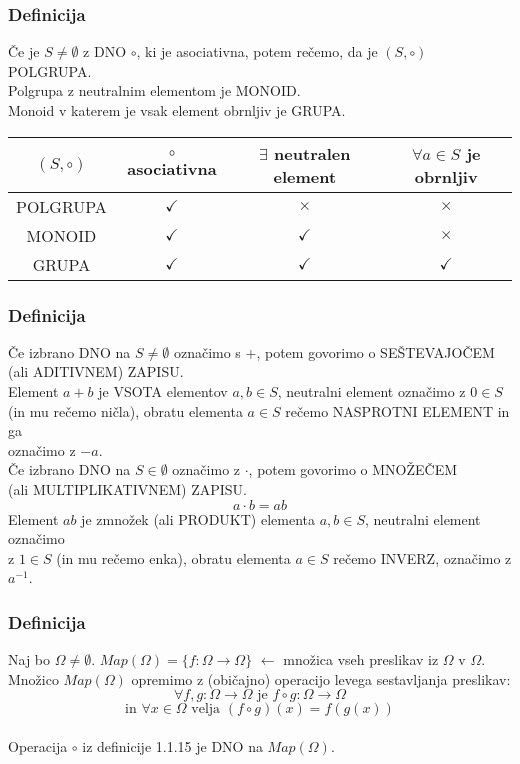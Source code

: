\subsubsection{Definicija}
Če je $S \ne \emptyset$ z DNO $\circ$, ki je asociativna, potem rečemo, da je $(S, \circ)$ POLGRUPA.\\
Polgrupa z neutralnim elementom je MONOID. \\
Monoid v katerem je vsak element obrnljiv je GRUPA.
\begin{center}
    \begin{tabular}{|c|c|c|c|}
        \hline
        $(S, \circ)$ & $\circ$ asociativna & $\exists$ neutralen element & $\forall a \in S$ je obrnljiv \\
        \hline
        POLGRUPA & $\checkmark$ & $\times$ & $\times$ \\
        \hline
        MONOID & $\checkmark$ & $\checkmark$ & $\times$ \\
        \hline
        GRUPA & $\checkmark$ & $\checkmark$ & $\checkmark$ \\
        \hline
    \end{tabular}
\end{center}

\subsubsection{Definicija}
Če izbrano DNO na $S \ne \emptyset$ označimo s +, potem govorimo o SEŠTEVAJOČEM \\
(ali ADITIVNEM) ZAPISU. \\[1em]
Element $a + b$ je VSOTA elementov $a, b \in S$, neutralni element označimo z $0 \in S$ \\
(in mu rečemo ničla), obratu elementa $a \in S$ rečemo NASPROTNI ELEMENT in ga \\
označimo z $-a$. \\[1em]
Če izbrano DNO na $S \in \emptyset$ označimo z $\cdot$, potem govorimo o MNOŽEČEM \\
(ali MULTIPLIKATIVNEM) ZAPISU.
$$a \cdot b = ab$$
Element $ab$ je zmnožek (ali PRODUKT) elementa $a, b \in S$, neutralni element označimo \\
z $1 \in S$ (in mu rečemo enka), obratu elementa $a \in S$ rečemo INVERZ, označimo z $a^{-1}$.

\subsubsection{Definicija}
Naj bo $\Omega \ne \emptyset$.
$Map(\Omega) = \{ f : \Omega \to \Omega \}$ $\leftarrow$ množica vseh preslikav iz $\Omega$ v $\Omega$. \\
Množico $Map(\Omega)$ opremimo z (običajno) operacijo levega sestavljanja preslikav:
$$
\forall f, g : \Omega \to \Omega \text{ je } f \circ g : \Omega \to \Omega
$$ 
$$
\text{in } \forall x \in \Omega \text{ velja } (f\circ g)(x) = f(g(x))
$$ \\
Operacija $\circ$ iz definicije 1.1.15 je DNO na $Map(\Omega)$.

